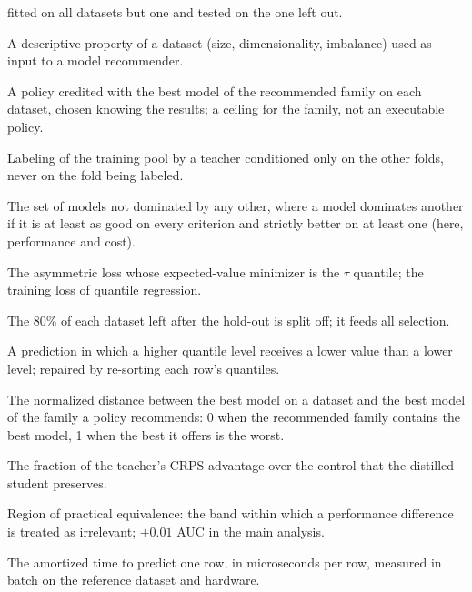 \begin{description}
    fitted on all datasets but one and tested on the one left out.
  \item[Meta-feature] A descriptive property of a dataset (size,
    dimensionality, imbalance) used as input to a model
    recommender.
  \item[Oracle (intra-family)] A policy credited with the best model
    of the recommended family on each dataset, chosen knowing the
    results; a ceiling for the family, not an executable policy.
  \item[Out-of-fold labeling] Labeling of the training pool by a
    teacher conditioned only on the other folds, never on the fold
    being labeled.
  \item[Pareto frontier] The set of models not dominated by any
    other, where a model dominates another if it is at least as good
    on every criterion and strictly better on at least one (here,
    performance and cost).
  \item[Pinball loss] The asymmetric loss whose expected-value
    minimizer is the $\tau$ quantile; the training loss of quantile
    regression.
  \item[Pool] The 80\% of each dataset left after the hold-out is
    split off; it feeds all selection.
  \item[Quantile crossing] A prediction in which a higher quantile
    level receives a lower value than a lower level; repaired by
    re-sorting each row's quantiles.
  \item[Regret] The normalized distance between the best model on a
    dataset and the best model of the family a policy recommends: 0 when the
    recommended family contains the best model, 1 when the best it
    offers is the worst.
  \item[Retention] The fraction of the teacher's CRPS advantage over
    the control that the distilled student preserves.
  \item[ROPE] Region of practical equivalence: the band within which
    a performance difference is treated as irrelevant; $\pm 0.01$ AUC
    in the main analysis.
  \item[Serving latency] The amortized time to predict one row, in
    microseconds per row, measured in batch on the reference dataset
    and hardware.
\end{description}
